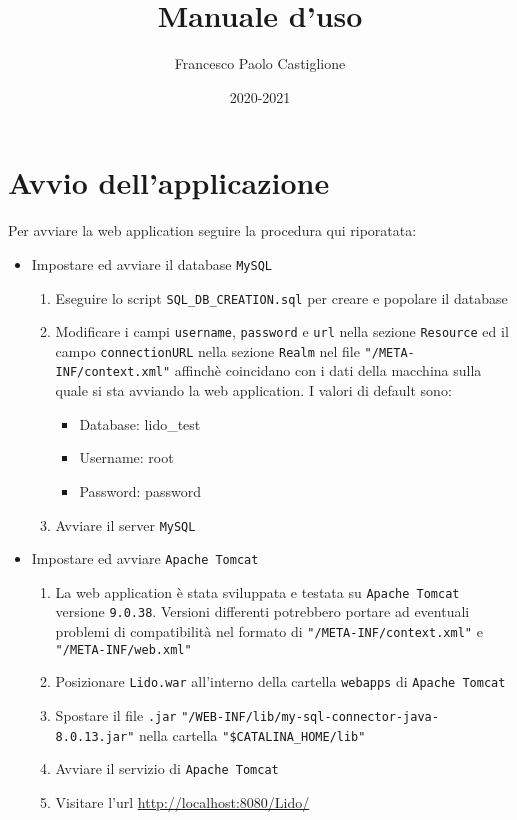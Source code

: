 \documentclass{article}
\title{Manuale d'uso}
\author{Francesco Paolo Castiglione}
\date{2020-2021}
\begin{document}
\maketitle

\tableofcontents
\newpage
\section{Avvio dell'applicazione}

Per avviare la web application seguire la procedura qui riporatata:

\begin{itemize}
	\item Impostare ed avviare il database \texttt{MySQL}
	\begin{enumerate}
		\item Eseguire lo script \texttt{SQL\_DB\_CREATION.sql} per creare e popolare il database
		\item Modificare i campi \texttt{username}, \texttt{password} e \texttt{url} nella sezione \texttt{Resource} ed il campo \texttt{connectionURL} nella sezione \texttt{Realm} nel file \texttt{"/META-INF/context.xml"} affinchè coincidano con i dati della macchina sulla quale si sta avviando la web application.\newline	
		I valori di default sono:
		\begin{itemize}
			\item Database: lido\_test
			\item Username: root
			\item Password: password
		\end{itemize}
		\item Avviare il server \texttt{MySQL}
	\end{enumerate}
	\item Impostare ed avviare \texttt{Apache Tomcat}
	\begin{enumerate}
		\item La web application è stata sviluppata e testata su \texttt{Apache Tomcat} versione \texttt{9.0.38}. Versioni differenti potrebbero portare ad eventuali problemi di compatibilità nel formato di \texttt{"/META-INF/context.xml"} e \texttt{"/META-INF/web.xml"}
		\item Posizionare \texttt{Lido.war} all'interno della cartella \texttt{webapps} di \texttt{Apache Tomcat}
		\item Spostare il file \texttt{.jar} \texttt{"/WEB-INF/lib/my-sql-connector-java-8.0.13.jar"} nella cartella \texttt{"\$CATALINA\_HOME/lib"}
		\item Avviare il servizio di \texttt{Apache Tomcat}
		\item Visitare l'url \url{http://localhost:8080/Lido/}
	\end{enumerate}
\end{itemize}
\newpage
\end{document}

